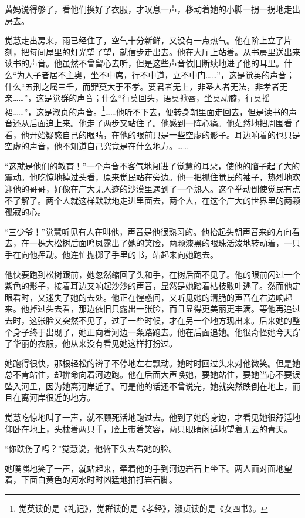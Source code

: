 \par 黄妈说得够了，看他们换好了衣服，才叹息一声，移动着她的小脚一拐一拐地走出房去。
\par 觉慧走出房来，雨已经住了，空气十分新鲜，又没有一点热气。他在阶上立了片刻，把每间屋里的灯光望了望，就信步走出去。他在大厅上站着。从书房里送出来读书的声音。他虽然不曾留心去听，但是这些声音依旧断续地进了他的耳里。什么“为人子者居不主奥，坐不中席，行不中道，立不中门……”，这是觉英的声音；什么“五刑之属三千，而罪莫大于不孝。要君者无上，非圣人者无法，非孝者无亲……”，这是觉群的声音；什么“行莫回头，语莫掀唇，坐莫动膝，行莫摇裙……”，这是淑贞的声音。\footnote{觉英读的是《礼记》，觉群读的是《孝经》，淑贞读的是《女四书》。}……他听不下去，便转身朝里面走回去，但是读书的声音还从后面追上来。他走了两步又站住了。他感到一阵心痛。他茫然地把周围看了看，他开始疑惑自己的眼睛，在他的眼前只是一些空虚的影子。耳边响着的也只是空虚的声音，他不知道自己究竟是在什么地方。……
\par “这就是他们的教育！”一个声音不客气地闯进了觉慧的耳朵，使他的脑子起了大的震动。他吃惊地掉过头看，原来觉民站在旁边。他一把抓住觉民的袖子，热烈地欢迎他的哥哥，好像在广大无人迹的沙漠里遇到了一个熟人。这个举动倒使觉民有点不了解了。两个人就这样默默地走进里面去，两个人，在这个广大的世界里的两颗孤寂的心。
\par “三少爷！”觉慧听见有人在叫他，声音是他很熟习的。他抬起头朝声音来的方向看去，在一株大松树后面鸣凤露出了她的笑脸，两颗漆黑的眼珠活泼地转动着，一只手在向他挥动。他连忙抛掷了手里的书，站起来向她跑去。
\par 他快要跑到松树跟前，她忽然缩回了头和手，在树后面不见了。他的眼前闪过一个紫色的影子，接着耳边又响起沙沙的声音，显然是她踏着枯枝败叶逃了。然而他定眼看时，又迷失了她的去处。他正在惶惑间，又听见她的清脆的声音在右边响起来。他掉过头去看，那边依旧只露出一张脸，而且显得更美丽更丰满。等他再追过去时，这张脸又突然不见了，过了一些时候，才在另一个地方现出来。后来她的整个身子终于出现了，她正向着河边一条路跑去。他在后面追她。他很奇怪她今天穿了华丽的衣服，他从来没有看见她这样打扮过。
\par 她跑得很快，那根轻松的辫子不停地左右飘动。她时时回过头来对他微笑。但是她总不肯站住，却拚命向着河边跑。他在后面大声唤她，要她站住，要她当心不要误坠入河里，因为她离河岸近了。可是他的话还不曾说完，她就突然跌倒在地上，而且在离河岸很近的地方。
\par 觉慧吃惊地叫了一声，就不顾死活地跑过去。他到了她的身边，才看见她很舒适地仰卧在地上，头枕着两只手，脸上带着笑容，两只眼睛闲适地望着无云的青天。
\par “你跌伤了吗？”觉慧说，他俯下头去看她的脸。
\par 她噗嗤地笑了一声，就站起来，牵着他的手到河边岩石上坐下。两人面对面地望着，下面白黄色的河水时时凶猛地拍打岩石脚。

